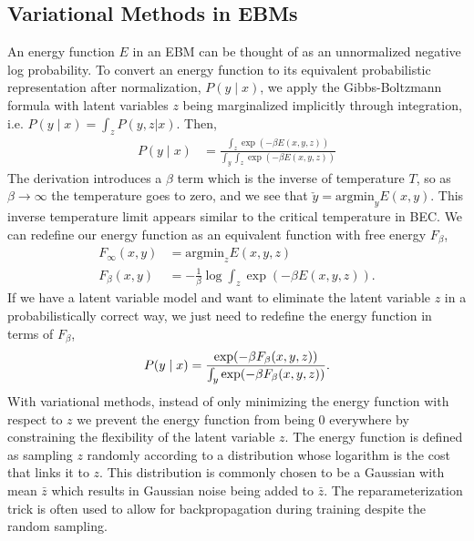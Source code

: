 \documentclass{article}
\begin{document}
    \subsection{Variational Methods in EBMs}
    An energy function $E$ in an EBM can be thought of as an unnormalized negative log probability. 
    To convert an energy function to its equivalent probabilistic representation after normalization,
    $P(y \mid x)$, we apply the Gibbs-Boltzmann formula with latent variables $z$ being marginalized implicitly through integration, i.e. $P(y \mid x) = \int_z P(y,z | x)$. Then,
    \begin{align*}
        P(y \mid x) &= \frac{ \int_z \exp(-\beta E(x,y,z)) }{ \int_y \int_z \exp(-\beta E(x, y, z))} 
    \end{align*}
    The derivation introduces a $\beta$ term which is the inverse of temperature $T$, so as $\beta \rightarrow \infty$ the temperature goes to zero, and we see that $\check{y} = \text{argmin}_{y} E(x,y)$. This inverse temperature limit appears similar to the critical temperature in BEC. We can redefine our energy function as an equivalent function with free energy $F_\beta$,
    \begin{align*}
        F_{\infty} (x,y) &= \text{argmin}_z E(x,y,z)\\
        F_{\beta} (x,y) &= -\frac{1}{\beta} \log \int_z \exp(-\beta E(x,y,z)).
    \end{align*}
    If we have a latent variable model and want to eliminate the latent variable $z$ in a probabilistically correct way, we just need to redefine the energy function in terms of $F_\beta$,
    \[
        P(y \mid x) = \frac{ \exp(-\beta F_\beta(x,y,z)) }{ \int_y \exp(-\beta F_\beta(x, y, z))}. \\
    \]
    With variational methods, instead of only minimizing the energy function with respect to $z$ we prevent the energy function from being 0 everywhere by constraining the flexibility of the latent variable $z$. The energy function is defined as sampling $z$ randomly according to a distribution whose logarithm is the cost that links it to $z$. This distribution is commonly chosen to be a Gaussian with mean $\bar z$ which results in Gaussian noise being added to $\bar z$. The reparameterization trick is often used to allow for backpropagation during training despite the random sampling.
\end{document}
